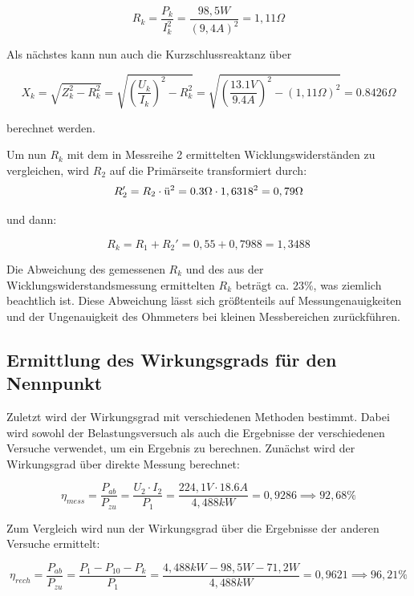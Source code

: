 \documentclass{article}
\begin{document}
\begin{equation*}
  R_{k} = \frac{P_{k}}{I_{k}^{2}} = \frac{98,5W}{(9,4A)^{2}} = 1,11\Omega
\end{equation*}

Als nächstes kann nun auch die Kurzschlussreaktanz über

\begin{equation*}
  X_{k} = \sqrt{Z_{k}^{2}-R_{k}^{2}} = \sqrt{\left(\frac{U_{k}}{I_{k}}\right)^{2}-R_{k}^{2}} = \sqrt{\left(\frac{13.1V}{9.4A}\right)^{2} - (1,11\Omega)^{2}} = 0.8426\Omega
\end{equation*}

berechnet werden.

Um nun $R_{k}$ mit dem in Messreihe 2 ermittelten Wicklungswiderständen zu vergleichen, wird $R_{2}$ auf die Primärseite transformiert durch:
\[
  R_{2}' = R_{2}\cdot \textnormal{ü}^{2} = 0.3\Omega \cdot 1,6318^{2} = 0,79\Omega
\]

und dann:

\[
  R_{k} = R_{1} + R_{2}' = 0,55 + 0,7988 = 1,3488
\]

Die Abweichung des gemessenen $R_{k}$ und des aus der Wicklungswiderstandsmessung ermittelten $R_{k}$ beträgt ca. $23\%$, was ziemlich beachtlich ist. Diese Abweichung lässt sich größtenteils auf Messungenauigkeiten und der Ungenauigkeit des Ohmmeters bei kleinen Messbereichen zurückführen.


\subsection{Ermittlung des Wirkungsgrads für den Nennpunkt}
\label{sec:ermittl-des-wirk}

Zuletzt wird der Wirkungsgrad mit verschiedenen Methoden bestimmt. Dabei wird sowohl der Belastungsversuch als auch die Ergebnisse der verschiedenen Versuche verwendet, um ein Ergebnis zu berechnen. Zunächst wird der Wirkungsgrad über direkte Messung berechnet:

\begin{equation*}
  \eta_{mess} = \frac{P_{ab}}{P_{zu}} = \frac{U_{2} \cdot I_{2}}{P_{1}} = \frac{224,1V \cdot 18.6A}{4,488kW} = 0,9286 \implies 92,68\%
\end{equation*}

Zum Vergleich wird nun der Wirkungsgrad über die Ergebnisse der anderen Versuche ermittelt:

\begin{equation*}
  \eta_{rech} = \frac{P_{ab}}{P_{zu}} = \frac{P_{1} - P_{10} - P_{k}}{P_{1}} = \frac{4,488kW - 98,5W - 71,2W}{4,488kW} = 0,9621 \implies 96,21\%
\end{equation*}
\end{document}
